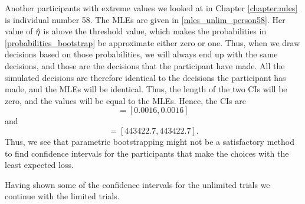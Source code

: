 Another participants with extreme values we looked at in Chapter \ref{chapter:mles} is individual number 58. The MLEs are given in \ref{mles_unlim_person58}. Her value of $\hat{\eta}$ is above the threshold value, which makes the probabilities in \eqref{probabilities_bootstrap} be approximate either zero or one. Thus, when we draw decisions based on those probabilities, we will always end up with the same decisions, and those are the decisions that the participant have made. All the simulated decisions are therefore identical to the decisions the participant has made, and the MLEs will be identical. Thus, the length of the two CIs will be zero, and the values will be equal to the MLEs. Hence, the CIs are
\begin{equation*}
    [\hat{\alpha}^{*(5)}_{1000},\hat{\alpha}^{*(95)}_{1000}] = [0.0016,0.0016]
\end{equation*}
and
\begin{equation*}
    [\hat{\eta}^{*(5)}_{1000},\hat{\eta}^{*(95)}_{1000}] = [443422.7,443422.7].
\end{equation*}
Thus, we see that parametric bootstrapping might not be a satisfactory method to find confidence intervals for the participants that make the choices with the least expected loss. 





Having shown some of the confidence intervals for the unlimited trials we continue with the limited trials.












